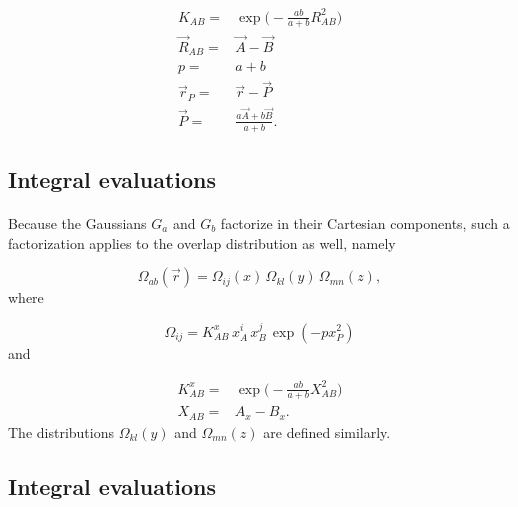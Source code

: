 \documentclass[%
twoside,                 %
final,                   %
10pt]{article}
\begin{document}
\begin{equation}
 \begin{split}
  K_{AB}  = & \exp\Big(-\frac{ab}{a + b}R^2_{AB}\Big) \\
  \vec R_{AB} = &  \vec A - \vec B \\
  p = & a + b\\
  \vec r_P = & \vec r - \vec P \\
  \vec P = & \frac{a\vec A + b\vec B}{a + b}.
 \end{split}
\end{equation}



\subsection*{Integral evaluations}

\paragraph{}

Because the Gaussians $G_a$ and $G_b$ factorize in their Cartesian components, such a factorization applies to the overlap distribution
as well, namely

\begin{equation}
 \Omega_{ab}(\vec r) = \Omega_{ij}(x)\,\Omega_{kl}(y)\,\Omega_{mn}(z),
\end{equation}
where

\begin{equation}
 \Omega_{ij} = K^x_{AB}\,x^i_A\,x^j_B\,\exp(-px^2_P)
\end{equation}
and

\begin{equation}
\begin{split}
 K^x_{AB} = & \exp\Big(-\frac{ab}{a + b}X^2_{AB}\Big) \\
   X_{AB} = & A_x - B_x.
\end{split}
\end{equation}
The distributions $\Omega_{kl}(y)$ and $\Omega_{mn}(z)$ are defined similarly.



\subsection*{Integral evaluations}

\end{document}
